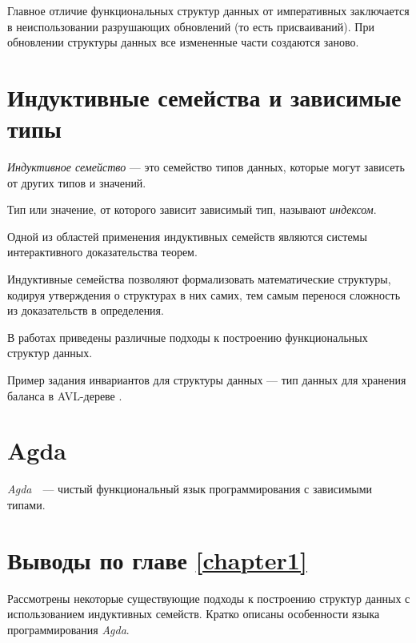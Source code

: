 Главное отличие функциональных структур данных от императивных \cite{OkasakiBook}
заключается в неиспользовании разрушающих обновлений (то есть присваиваний).
При обновлении структуры данных все измененные части создаются заново.

\section{Индуктивные семейства и зависимые типы}

\begin{definition}
\emph{Индуктивное семейство} \cite{DybjerIndFam}— это семейство типов данных,
которые могут зависеть от других типов и значений.

Тип или значение, от которого зависит зависимый тип, называют \emph{индексом}.
\end{definition}

Одной из областей применения индуктивных семейств являются системы интерактивного
доказательства теорем.

Индуктивные семейства позволяют формализовать математические структуры,
кодируя утверждения о структурах в них самих, тем самым перенося сложность из
доказательств в определения.

В работах \cite{OkasakiThesis, McBridePivotal} приведены различные подходы
к построению функциональных структур данных.

Пример задания инвариантов для
структуры данных — тип данных для хранения баланса в AVL-дереве \cite{AVLTree}.
\newline


\section{Agda}
\textit{Agda}~\cite{AgdaLang}~---  чистый функциональный язык программирования с зависимыми типами.


\section{Выводы по главе \ref{chapter1}}
Рассмотрены некоторые существующие подходы к построению структур данных
с использованием индуктивных семейств.
Кратко описаны особенности языка программирования \textit{Agda}.
